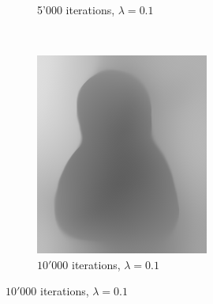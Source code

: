 \documentclass{paper}
\begin{document}
\begin{figure}[h]
\begin{subfigure}[h]{0.3\textwidth}
	\caption*{5'000 iterations, $\lambda = 0.1$}
\end{subfigure}
~
\begin{subfigure}[h]{0.3\textwidth}
	\centering
	\includegraphics[width=\textwidth]{hat-iter10000-lambda0_1-alpha0_001}
	\caption*{$10'000$ iterations, $\lambda = 0.1$}
\end{subfigure}


\end{figure}
\end{document}
